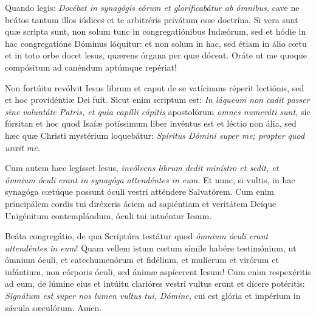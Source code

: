 {\noindent Quando legis: \emph{Docébat in synagógis eórum et glorificabátur ab ómnibus,} cave ne beátos tantum illos iúdices et te arbitréris privátum esse doctrína. Si vera sunt quæ scripta sunt, non solum tunc in congregatiónibus Iudæórum, sed et hódie in hac congregatióne Dóminus lóquitur: et non solum in hac, sed étiam in álio cœtu et in toto orbe docet lesus, quærens órgana per quæ dóceat. Oráte ut me quoque compósitum ad canéndum aptúmque repériat!

\noindent Non fortúitu revólvit Iesus librum et caput de se vatícinans réperit lectiónis, sed et hoc providéntiæ Dei fuit. Sicut enim scriptum est: \emph{In láqueum non cadit passer sine voluntáte Patris, et quia capílli cápitis} apostolórum \emph{omnes numeráti sunt,} sic fórsitan et hoc quod Isaíæ potíssimum liber invéntus est et léctio non ália, sed hæc quæ Christi mystérium loquebátur: \emph{Spíritus Dómini super me; propter quod unxit me.}

\noindent Cum autem hæc legísset lesus, \emph{invólvens librum dedit minístro et sedit, et ómnium óculi erant in synagóga attendéntes in eum.} Et nunc, si vultis, in hac synagóga cœtúque possunt óculi vestri atténdere Salvatórem. Cum enim principálem cordis tui diréxeris áciem ad sapiéntiam et veritátem Deíque Unigénitum contemplándum, óculi tui intuéntur Iesum.

\noindent Beáta congregátio, de qua Scriptúra testátur quod \emph{ómnium óculi erant attendéntes in eum}! Quam vellem istum cœtum símile habére testimónium, ut ómnium óculi, et catechumenórum et fidélium, et mulíerum et virórum et infántium, non córporis óculi, sed ánimæ aspícerent Iesum! Cum enim respexéritis ad eum, de lúmine eius et intúitu clarióres vestri vultus erunt et dícere potéritis: \emph{Signátum est super nos lumen vultus tui, Dómine,} cui est glória et impérium in sǽcula sæculórum. Amen.

\vfill
\pagebreak

 

\vspace{-5mm}


\vfill
\pagebreak
}
\newcommand{\benedictus}{\pars{Canticum Zachariæ.} \scriptura{Lc. 4, 14}

\vspace{-4mm}

\antiphona{I D\textsuperscript{2}}{temporalia/ant-regressusiesus.gtex}

\vspace{-2mm}

\scriptura{Lc. 1, 68-79}

\vspace{-2mm}

\cantusSineNeumas
\initiumpsalmi{temporalia/benedictus-initium-isoll-D2-auto.gtex}


 \Abardot{}}
